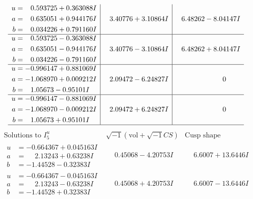 \documentclass[1p]{elsarticle_modified}
\theoremstyle{definition}
\newcommand{\I}{\sqrt{-1}}
\begin{document}
$$\begin{array}{c|c|c}
\begin{aligned}
u &= \phantom{-}0.593725 + 0.363088 I \\
a &= \phantom{-}0.635051 + 0.944176 I \\
b &= \phantom{-}0.034226 + 0.791160 I\end{aligned}
 & \phantom{-}3.40776 + 3.10864 I & \phantom{-}6.48262 - 8.04147 I \\ \hline\begin{aligned}
u &= \phantom{-}0.593725 - 0.363088 I \\
a &= \phantom{-}0.635051 - 0.944176 I \\
b &= \phantom{-}0.034226 - 0.791160 I\end{aligned}
 & \phantom{-}3.40776 - 3.10864 I & \phantom{-}6.48262 + 8.04147 I \\ \hline\begin{aligned}
u &= -0.996147 + 0.881069 I \\
a &= -1.068970 + 0.009212 I \\
b &= \phantom{-}1.05673 - 0.95101 I\end{aligned}
 & \phantom{-}2.09472 - 6.24827 I & \phantom{-0.000000 } 0 \\ \hline\begin{aligned}
u &= -0.996147 - 0.881069 I \\
a &= -1.068970 - 0.009212 I \\
b &= \phantom{-}1.05673 + 0.95101 I\end{aligned}
 & \phantom{-}2.09472 + 6.24827 I & \phantom{-0.000000 } 0\\
 \hline 
 \end{array}$$\newpage$$\begin{array}{c|c|c}  
\text{Solutions to }I^u_{5}& \I (\text{vol} + \sqrt{-1}CS) & \text{Cusp shape}\\
 \hline 
\begin{aligned}
u &= -0.664367 + 0.045163 I \\
a &= \phantom{-}2.13243 + 0.63238 I \\
b &= -1.44528 - 0.32383 I\end{aligned}
 & \phantom{-}0.45068 - 4.20753 I & \phantom{-}6.6007 + 13.6446 I \\ \hline\begin{aligned}
u &= -0.664367 - 0.045163 I \\
a &= \phantom{-}2.13243 - 0.63238 I \\
b &= -1.44528 + 0.32383 I\end{aligned}
 & \phantom{-}0.45068 + 4.20753 I & \phantom{-}6.6007 - 13.6446 I \\ \hline\begin{aligned}

\end{aligned}
\end{array}$$
\end{document}
